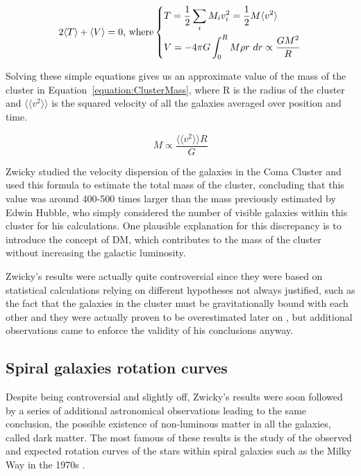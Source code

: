 \documentclass[a4paper, 10pt, openright]{report}
\begin{document}
\begin{equation} \label{equation:Virial}
2 \langle T \rangle + \langle V \rangle = 0 \text{, where}
\begin{dcases}
T = \frac{1}{2} \sum_i M_i v_i^2 = \frac{1}{2} M \langle v^2 \rangle\\
V = -4 \pi G \int_0^R M \rho r \text{ } dr \propto \frac{G M^2}{R}
\end{dcases}
\end{equation}

Solving these simple equations gives us an approximate value of the mass of the cluster in Equation~\ref{equation:ClusterMass}, where R is the radius of the cluster and $\langle \langle v^2 \rangle \rangle$ is the squared velocity of all the galaxies averaged over position and time.

\begin{equation} \label{equation:ClusterMass}
M \propto \frac{\langle \langle v^2 \rangle \rangle R}{G}
\end{equation} 

Zwicky studied the velocity dispersion of the galaxies in the Coma Cluster and used this formula to estimate the total mass of the cluster, concluding that this value was around 400-500 times larger than the mass previously estimated by Edwin Hubble, who simply considered the number of visible galaxies within this cluster for his calculations. One plausible explanation for this discrepancy is to introduce the concept of \ac{DM}, which contributes to the mass of the cluster without increasing the galactic luminosity.

Zwicky's results were actually quite controversial since they were based on statistical calculations relying on different hypotheses not always justified, such as the fact that the galaxies in the cluster must be gravitationally bound with each other and they were actually proven to be overestimated later on \cite{ZwickyWrong}, but additional observations came to enforce the validity of his conclusions anyway.

\subsection{Spiral galaxies rotation curves}

Despite being controversial and slightly off, Zwicky's results were soon followed by a series of additional astronomical observations leading to the same conclusion, the possible existence of non-luminous matter in all the galaxies, called dark matter. The most famous of these results is the study of the observed and expected rotation curves of the stars within spiral galaxies such as the Milky Way in the 1970s \cite{RotationCurves}. 
\end{document}
